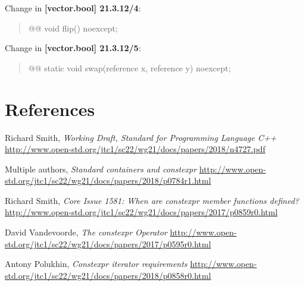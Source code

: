 \documentclass{wg21}
\begin{document}
Change in \textbf{[vector.bool] 21.3.12/4}:
\begin{quote}
\begin{itemdecl}
@@ void flip() noexcept;
\end{itemdecl}
\end{quote}

Change in \textbf{[vector.bool] 21.3.12/5}:
\begin{quote}
\begin{itemdecl}
@@ static void swap(reference x, reference y) noexcept;
\end{itemdecl}
\end{quote}


\section{References}
\renewcommand{\section}[2]{}%
\begin{thebibliography}{9}

  Richard Smith,
  \emph{Working Draft, Standard for Programming Language C++}\newline
  \url{http://www.open-std.org/jtc1/sc22/wg21/docs/papers/2018/n4727.pdf}

  Multiple authors,
  \emph{Standard containers and constexpr}\newline
  \url{http://www.open-std.org/jtc1/sc22/wg21/docs/papers/2018/p0784r1.html}

  Richard Smith,
  \emph{Core Issue 1581: When are constexpr member functions defined?}\newline
  \url{http://www.open-std.org/jtc1/sc22/wg21/docs/papers/2017/p0859r0.html}

  David Vandevoorde,
  \emph{The constexpr Operator}\newline
  \url{http://www.open-std.org/jtc1/sc22/wg21/docs/papers/2017/p0595r0.html}

  Antony Polukhin,
  \emph{Constexpr iterator requirements}\newline
  \url{http://www.open-std.org/jtc1/sc22/wg21/docs/papers/2018/p0858r0.html}

\end{thebibliography}
\end{document}
